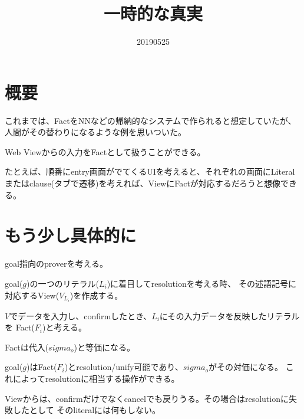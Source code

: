 \documentclass[10pt, onecolumn]{jarticle}   	%
\title{一時的な真実}
\author{\myname}
\date{20190525}					%
\begin{document}
\maketitle

\section{概要}

これまでは、FactをNNなどの帰納的なシステムで作られると想定していたが、人間がその替わりになるような例を思いついた。

Web Viewからの入力をFactとして扱うことができる。

たとえば、順番にentry画面がでてくるUIを考えると、それぞれの画面にLiteralまたはclause(タブで遷移)を考えれば、ViewにFactが対応するだろうと想像できる。

\section{もう少し具体的に}
goal指向のproverを考える。

goal($g$)の一つのリテラル($L_i$)に着目してresolutionを考える時、
その述語記号に対応するView($V_{L_i}$)を作成する。

$V$でデータを入力し、confirmしたとき、$L_i$にその入力データを反映したリテラルを
Fact($F_i$)と考える。

Factは代入($sigma_o$)と等価になる。

goal($g$)はFact($F_i$)とresolution/unify可能であり、$sigma_o$がその対価になる。
これによってresolutionに相当する操作ができる。

Viewからは、confirmだけでなくcancelでも戻りうる。その場合はresolutionに失敗したとして
そのliteralには何もしない。
\end{document}
